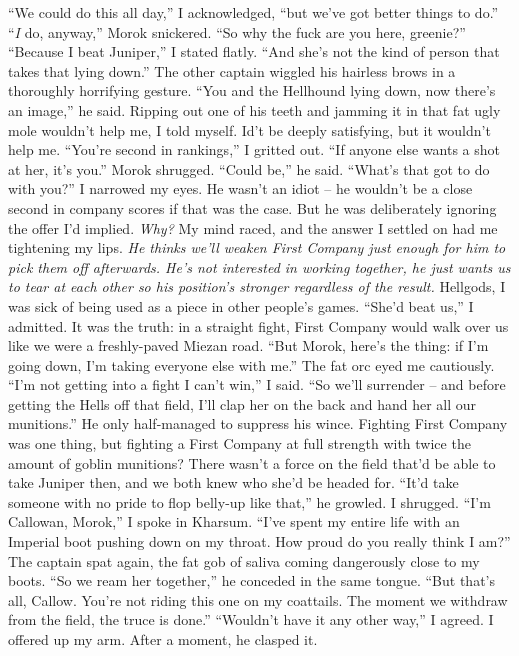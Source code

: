 \documentclass[12pt, openany]{book}
\begin{document}
“We could do this all day,” I acknowledged, “but we’ve got better things to do.”
“\textit{I} do, anyway,” Morok snickered. “So why the fuck are you here, greenie?”
“Because I beat Juniper,” I stated flatly. “And she’s not the kind of person that takes that lying down.”
The other captain wiggled his hairless brows in a thoroughly horrifying gesture.
“You and the Hellhound lying down, now there’s an image,” he said.
Ripping out one of his teeth and jamming it in that fat ugly mole wouldn’t help me, I told myself. Id’t be deeply satisfying, but it wouldn’t help me.
“You’re second in rankings,” I gritted out. “If anyone else wants a shot at her, it’s you.”
Morok shrugged.
“Could be,” he said. “What’s that got to do with you?”
I narrowed my eyes. He wasn’t an idiot – he wouldn’t be a close second in company scores if that was the case. But he was deliberately ignoring the offer I’d implied. \textit{Why?} My mind raced, and the answer I settled on had me tightening my lips. \textit{He thinks we’ll weaken First Company just enough for him to pick them off afterwards. He’s not interested in working together, he just wants us to tear at each other so his position’s stronger regardless of the result.} Hellgods, I was sick of being used as a piece in other people’s games.
“She’d beat us,” I admitted. It was the truth: in a straight fight, First Company would walk over us like we were a freshly-paved Miezan road. “But Morok, here’s the thing: if I’m going down, I’m taking everyone else with me.”
The fat orc eyed me cautiously.
“I’m not getting into a fight I can’t win,” I said. “So we’ll surrender – and before getting the Hells off that field, I’ll clap her on the back and hand her all our munitions.”
He only half-managed to suppress his wince. Fighting First Company was one thing, but fighting a First Company at full strength with twice the amount of goblin munitions? There wasn’t a force on the field that’d be able to take Juniper then, and we both knew who she’d be headed for.
“It’d take someone with no pride to flop belly-up like that,” he growled.
I shrugged.
“I’m Callowan, Morok,” I spoke in Kharsum. “I’ve spent my entire life with an Imperial boot pushing down on my throat. How proud do you really think I am?”
The captain spat again, the fat gob of saliva coming dangerously close to my boots.
“So we ream her together,” he conceded in the same tongue. “But that’s all, Callow. You’re not riding this one on my coattails. The moment we withdraw from the field, the truce is done.”
“Wouldn’t have it any other way,” I agreed.
I offered up my arm. After a moment, he clasped it.
\end{document}
